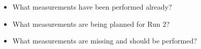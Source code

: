 \label{measurements}

\begin{itemize}
\item What measurements have been performed already?
\item What measurements are being planned for Run 2?
\item What measurements are missing and should be performed?
\end{itemize}